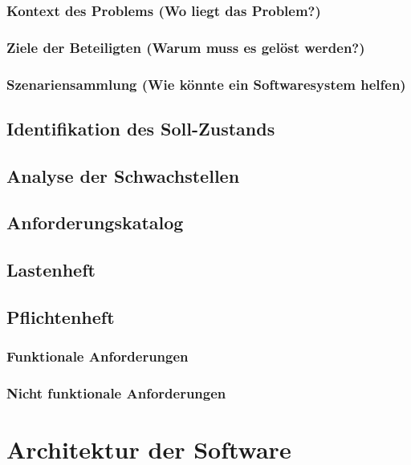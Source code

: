 \documentclass{scrreprt}
\begin{document}
\subsection{Kontext des Problems (Wo liegt das Problem?)}

\subsection{Ziele der Beteiligten (Warum muss es gelöst werden?)}

\subsection{Szenariensammlung (Wie könnte ein Softwaresystem helfen)}

\section{Identifikation des Soll-Zustands}

\section{Analyse der Schwachstellen}

\section{Anforderungskatalog}

\section{Lastenheft}

\section{Pflichtenheft}

\subsection{Funktionale Anforderungen}

\subsection{Nicht funktionale Anforderungen}


\chapter{Architektur der Software}
\end{document}

